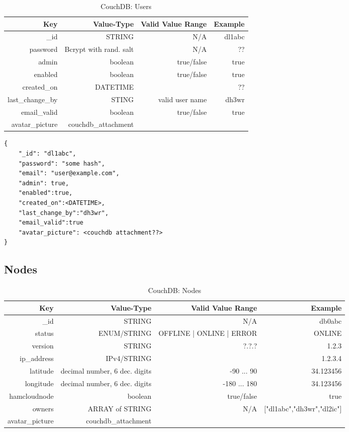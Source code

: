 \begin{table}[h]
 \caption{CouchDB: Users}
 \begin{tabular}{r|r|r|r}
  Key & Value-Type & Valid Value Range & Example \\
  \hline
  \_id & STRING & N/A & dl1abc \\
  password & Bcrypt with rand. salt & N/A & ?? \\
  admin & boolean & true/false & true \\
  enabled & boolean & true/false & true \\
  created\_on & DATETIME & & ??\\
  last\_change\_by & STING & valid user name & dh3wr \\
  email\_valid & boolean & true/false & true \\
  avatar\_picture & couchdb\_attachment & & \\
  \end{tabular}
  \label{tab:couchdb:users}
\end{table}

\begin{lstlisting}
{
	"_id": "dl1abc",
	"password": "some hash",
    "email": "user@example.com",
    "admin": true,
    "enabled":true,
    "created_on":<DATETIME>,
    "last_change_by":"dh3wr",
    "email_valid":true
    "avatar_picture": <couchdb attachment??>
}
\end{lstlisting}

\subsection{Nodes}
\begin{table}[h]
 \caption{CouchDB: Nodes}
 \begin{tabular}{r|r|r|r}
  Key & Value-Type & Valid Value Range & Example \\
  \hline
  \_id & STRING & N/A & db0abc \\
  status & ENUM/STRING & OFFLINE | ONLINE | ERROR & ONLINE \\
  version & STRING & ?.?.? & 1.2.3 \\
  ip\_address & IPv4/STRING & & 1.2.3.4 \\
  latitude & decimal number, 6 dec. digits & -90 ... 90 & 34.123456 \\
  longitude & decimal number, 6 dec. digits & -180 ... 180 & 34.123456 \\
  hamcloudnode & boolean & true/false & true \\
  owners & ARRAY of STRING & N/A & ["dl1abc","dh3wr","dl2ic"] \\
  avatar\_picture & couchdb\_attachment & & \\
  \end{tabular}
  \label{tab:couchdb:nodes}
\end{table}

